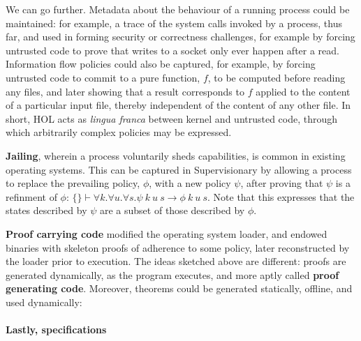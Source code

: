 \documentclass[sigplan, review]{acmart}
\newcommand{\deffont}[1]{\textbf{#1}}
\newcommand{\fall}[1]{\forall{#1}.}
\begin{document}
We can go further.
Metadata about the behaviour of a running process could be maintained: for example, a trace of the system calls invoked by a process, thus far, and used in forming security or correctness challenges, for example by forcing untrusted code to prove that writes to a socket only ever happen after a read.
Information flow policies could also be captured, for example, by forcing untrusted code to commit to a pure function, $f$, to be computed before reading any files, and later showing that a result corresponds to $f$ applied to the content of a particular input file, thereby independent of the content of any other file.
In short, HOL acts as \emph{lingua franca} between kernel and untrusted code, through which arbitrarily complex policies may be expressed.

\deffont{Jailing}, wherein a process voluntarily sheds capabilities, is common in existing operating systems.
This can be captured in Supervisionary by allowing a process to replace the prevailing policy, $\phi$, with a new policy $\psi$, after proving that $\psi$ is a refinment of $\phi$: $\{\} \vdash \fall{k}\fall{u}\fall{s} \psi\ k\ u\ s \longrightarrow \phi\ k\ u\ s$.
Note that this expresses that the states described by $\psi$ are a subset of those described by $\phi$.

\deffont{Proof carrying code} modified the operating system loader, and endowed binaries with skeleton proofs of adherence to some policy, later reconstructed by the loader prior to execution.
The ideas sketched above are different: proofs are generated dynamically, as the program executes, and more aptly called \deffont{proof generating code}.
Moreover, theorems could be generated statically, offline, and used dynamically:

\paragraph{Lastly, specifications}
\end{document}
